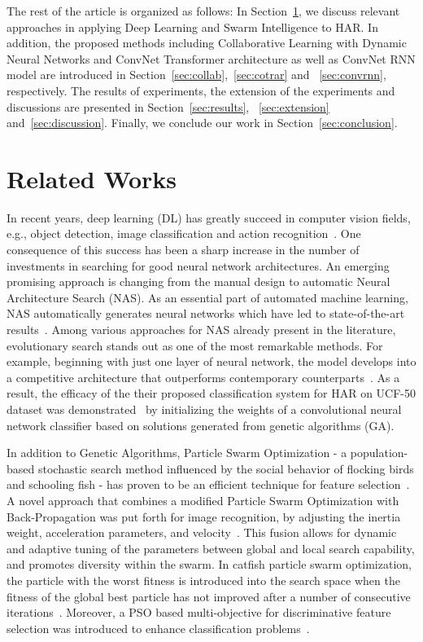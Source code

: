\documentclass[fleqn,10pt]{wlscirep}
\begin{document}
The rest of the article is organized as follows: In Section~\ref{sec:background}, we discuss relevant approaches in applying Deep Learning and Swarm Intelligence to HAR. In addition, the proposed methods including Collaborative Learning with Dynamic Neural Networks and ConvNet Transformer architecture as well as ConvNet RNN model are introduced in Section~\ref{sec:collab},~\ref{sec:cotrar} and ~\ref{sec:convrnn}, respectively. The results of experiments, the extension of the experiments and discussions are presented in Section~\ref{sec:results}, ~\ref{sec:extension} and~\ref{sec:discussion}. Finally, we conclude our work in Section~\ref{sec:conclusion}.
\section{Related Works}
\label{sec:background}


In recent years, deep learning (DL) has greatly succeed in computer vision fields, e.g., object detection, image classification and action recognition~\cite{ijjina2016human,gowda2021smart,arnab2021vivit}. One consequence of this success has been a sharp increase in the number of investments in searching for good neural network architectures. An emerging promising approach is changing from the manual design to automatic Neural Architecture Search (NAS). As an essential part of 
automated machine learning, NAS automatically generates neural networks which have led to state-of-the-art results~\cite{real2017large,nayman2019xnas,noy2020asap}. Among various approaches for NAS already present in the literature, evolutionary search stands out as one of the most remarkable methods. For example, beginning with just one layer of neural network, the model develops into a competitive architecture that outperforms contemporary counterparts~\cite{real2017large}.  As a result, the efficacy of the their proposed classification system for HAR on UCF-50 dataset was demonstrated~\cite{ijjina2016human} by initializing the weights of a convolutional neural network classifier based on solutions generated from genetic algorithms (GA).

In addition to Genetic Algorithms, Particle Swarm Optimization - a population-based stochastic search method influenced by the social behavior of flocking birds and schooling fish - has proven to be an efficient technique for feature selection~\cite{kennedy1995particle,shi1998modified}. A novel approach that combines a modified Particle Swarm Optimization with Back-Propagation was put forth for image recognition, by adjusting the inertia weight, acceleration parameters, and velocity~\cite{tu2021modpso}. This fusion allows for dynamic and adaptive tuning of the parameters between global and local search capability, and promotes diversity within the swarm. In catfish particle swarm optimization, the particle with the worst fitness is introduced into the search space when the fitness of the global best particle has not improved after a number of consecutive iterations~\cite{chuang2011improved}. Moreover, a PSO based multi-objective for discriminative feature selection was introduced to enhance classification problems~\cite{xue2012particle}.
\end{document}
